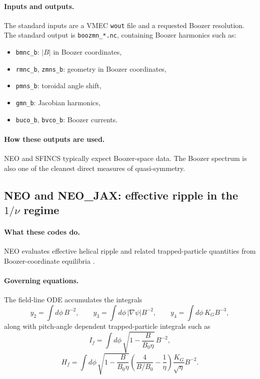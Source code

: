 \documentclass[11pt]{article}
\begin{document}
\paragraph{Inputs and outputs.}
The standard inputs are a VMEC \texttt{wout} file and a requested Boozer
resolution. The standard output is \texttt{boozmn\_*.nc}, containing Boozer
harmonics such as:
\begin{itemize}
  \item \texttt{bmnc\_b}: $|B|$ in Boozer coordinates,
  \item \texttt{rmnc\_b}, \texttt{zmns\_b}: geometry in Boozer coordinates,
  \item \texttt{pmns\_b}: toroidal angle shift,
  \item \texttt{gmn\_b}: Jacobian harmonics,
  \item \texttt{buco\_b}, \texttt{bvco\_b}: Boozer currents.
\end{itemize}

\paragraph{How these outputs are used.}
NEO and SFINCS typically expect Boozer-space data. The Boozer spectrum is also
one of the cleanest direct measures of quasi-symmetry.

\subsection{NEO and NEO\_JAX: effective ripple in the $1/\nu$ regime}

\paragraph{What these codes do.}
NEO evaluates effective helical ripple and related trapped-particle quantities
from Boozer-coordinate equilibria \citep{Nemov1999,NEORepo,NEOJaxRepo}.

\paragraph{Governing equations.}
The field-line ODE accumulates the integrals
\begin{equation}
y_2 = \int d\phi\,B^{-2},
\qquad
y_3 = \int d\phi\,|\nabla\psi|B^{-2},
\qquad
y_4 = \int d\phi\,K_G B^{-3},
\end{equation}
along with pitch-angle dependent trapped-particle integrals such as
\begin{equation}
I_f = \int d\phi\,\sqrt{1-\frac{B}{B_0\eta}}\,B^{-2},
\end{equation}
\begin{equation}
H_f = \int d\phi\,\sqrt{1-\frac{B}{B_0\eta}}
\left(\frac{4}{B/B_0} - \frac{1}{\eta}\right)\frac{K_G}{\sqrt{\eta}}B^{-2}.
\end{equation}
\end{document}
